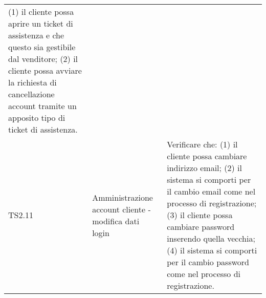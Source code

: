 \begin{center}
\begin{longtable}{|p{1cm}|p{6.85cm}|p{7cm}|}
													(1) il cliente possa aprire un ticket di assistenza e che questo sia gestibile dal venditore;
													(2) il cliente possa avviare la richiesta di cancellazione account tramite un apposito tipo di ticket di assistenza. \\
	TS2.11 & Amministrazione account cliente - modifica dati login & Verificare che:
													(1) il cliente possa cambiare indirizzo email;
													(2) il sistema si comporti per il cambio email come nel processo di registrazione;
													(3) il cliente possa cambiare password inserendo quella vecchia;
													(4) il sistema si comporti per il cambio password come nel processo di registrazione. \\
	\hline

	\end{longtable}
\end{center}

